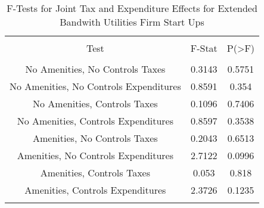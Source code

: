 
\begin{table}[!htbp] \centering 
  \caption{F-Tests for Joint Tax and Expenditure Effects for Extended Bandwith Utilities Firm Start Ups} 
  \label{22Ftests} 
\begin{tabular}{@{\extracolsep{5pt}} ccc} 
\\[-1.8ex]\hline 
\hline \\[-1.8ex] 
Test & F-Stat & P(\textgreater F) \\ 
\hline \\[-1.8ex] 
No Amenities, No Controls Taxes & 0.3143 & 0.5751 \\ 
No Amenities, No Controls Expenditures & 0.8591 & 0.354 \\ 
No Amenities, Controls Taxes & 0.1096 & 0.7406 \\ 
No Amenities, Controls Expenditures & 0.8597 & 0.3538 \\ 
Amenities, No Controls Taxes & 0.2043 & 0.6513 \\ 
Amenities, No Controls Expenditures & 2.7122 & 0.0996 \\ 
Amenities, Controls Taxes & 0.053 & 0.818 \\ 
Amenities, Controls Expenditures & 2.3726 & 0.1235 \\ 
\hline \\[-1.8ex] 
\end{tabular} 
\end{table} 
